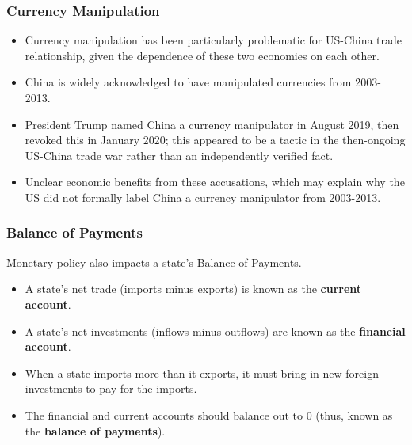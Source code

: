 \documentclass{beamer}
\begin{document}
\begin{frame} 
	\frametitle{\LARGE{Currency Manipulation}}
		\begin{itemize}
			\item Currency manipulation has been particularly problematic for US-China trade relationship, given the dependence of these two economies on each other. \pause 
			\item China is widely acknowledged to have manipulated currencies from 2003-2013. \pause 
			\item President Trump named China a currency manipulator in August 2019, then revoked this in January 2020; this appeared to be a tactic in the then-ongoing US-China trade war rather than an independently verified fact. \pause
			\item Unclear economic benefits from these accusations, which may explain why the US did not formally label China a currency manipulator from 2003-2013.
		\end{itemize}	
\end{frame}



\begin{frame} 
	\frametitle{\LARGE{Balance of Payments}}
	Monetary policy also impacts a state's Balance of Payments.
	\begin{itemize}
		\item A state's net trade (imports minus exports) is known as the \textbf{current account}. \pause
		\item A state's net investments (inflows minus outflows) are known as the \textbf{financial account}. \pause
		\item When a state imports more than it exports, it must bring in new foreign investments to pay for the imports. \pause 
		\item The financial and current accounts should balance out to 0 (thus, known as the \textbf{balance of payments}). 
	\end{itemize}
\end{frame}
\end{document}
